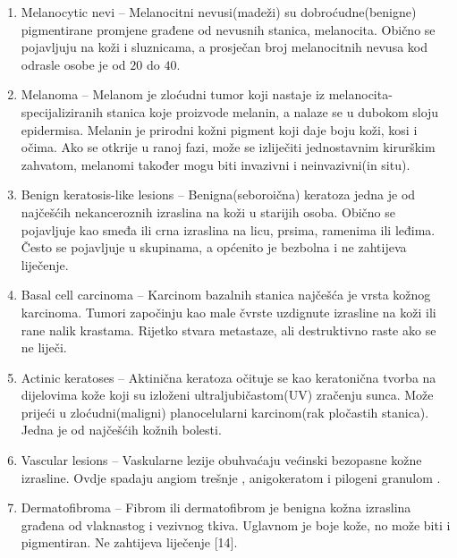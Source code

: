 \documentclass[times, utf8, zavrsni]{fer}
\begin{document}
\begin{enumerate}
\item Melanocytic nevi -- Melanocitni nevusi(madeži) su dobroćudne(benigne) pigmentirane promjene građene od nevusnih stanica, melanocita. Obično se pojavljuju na koži i sluznicama, a prosječan broj melanocitnih nevusa kod odrasle osobe je od $20$ do $40$.

\item Melanoma -- Melanom je zloćudni tumor koji nastaje iz melanocita-specijaliziranih stanica koje proizvode melanin, a nalaze se u dubokom sloju epidermisa. Melanin je prirodni kožni pigment koji daje boju koži, kosi i očima. Ako se otkrije u ranoj fazi, može se izliječiti jednostavnim kirurškim zahvatom, melanomi također mogu biti invazivni i neinvazivni(in situ). 

\item Benign keratosis-like lesions -- Benigna(seboroična) keratoza jedna je od najčešćih nekanceroznih izraslina na koži u starijih osoba. Obično se pojavljuje kao smeđa ili crna izraslina na licu, prsima, ramenima ili leđima. Često se pojavljuje u skupinama, a općenito je bezbolna i ne zahtijeva liječenje.

\item Basal cell carcinoma -- Karcinom bazalnih stanica najčešća je vrsta kožnog karcinoma. Tumori započinju kao male čvrste uzdignute izrasline na koži ili rane nalik krastama. Rijetko stvara metastaze, ali destruktivno raste ako se ne liječi.

\item Actinic keratoses -- Aktinična keratoza očituje se kao keratonična tvorba na dijelovima kože koji su izloženi ultraljubičastom(UV) zračenju sunca. Može prijeći u zloćudni(maligni) planocelularni karcinom(rak pločastih stanica). Jedna je od najčešćih kožnih bolesti.

\item Vascular lesions -- Vaskularne lezije obuhvaćaju većinski bezopasne kožne izrasline. Ovdje spadaju angiom trešnje , anigokeratom  i pilogeni granulom .

\item Dermatofibroma -- Fibrom ili dermatofibrom je benigna kožna izraslina građena od vlaknastog i vezivnog tkiva. Uglavnom je boje kože, no može biti i pigmentiran. Ne zahtijeva liječenje [14].

\end{enumerate}
%
\end{document}
